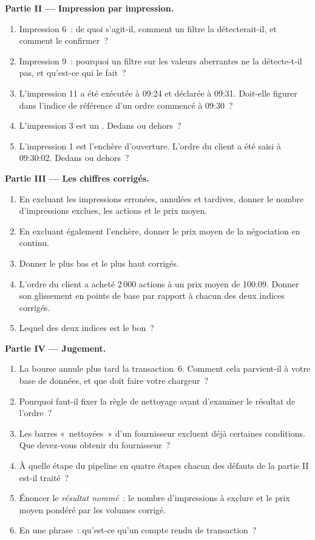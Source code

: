 \begin{problem}
\medskip\noindent\textbf{Partie II --- Impression par impression.}
\begin{enumerate}[resume]
\item Impression 6~: de quoi s'agit-il, comment un filtre la détecterait-il, et comment
le confirmer~?
\item Impression 9~: pourquoi un filtre sur les valeurs aberrantes ne la détecte-t-il pas, et qu'est-ce qui le fait~?
\item L'impression 11 a été exécutée à 09:24 et déclarée à 09:31. Doit-elle figurer dans
l'indice de référence d'un ordre commencé à 09:30~?
\item L'impression 3 est un . Dedans ou dehors~?
\item L'impression 1 est l'enchère d'ouverture. L'ordre du client a été saisi à
09:30:02. Dedans ou dehors~?
\end{enumerate}

\medskip\noindent\textbf{Partie III --- Les chiffres corrigés.}
\begin{enumerate}[resume]
\item En excluant les impressions erronées, annulées et tardives, donner le nombre
d'impressions exclues, les actions et le prix moyen.
\item En excluant également l'enchère, donner le prix moyen de la
négociation en continu.
\item Donner le plus bas et le plus haut corrigés.
\item L'ordre du client a acheté 2\,000 actions à un prix moyen de 100.09. Donner son
glissement en points de base par rapport à chacun des deux indices corrigés.
\item Lequel des deux indices est le bon~?
\end{enumerate}

\medskip\noindent\textbf{Partie IV --- Jugement.}
\begin{enumerate}[resume]
\item La bourse annule plus tard la transaction~6. Comment cela parvient-il à votre base de
données, et que doit faire votre chargeur~?
\item Pourquoi faut-il fixer la règle de nettoyage avant d'examiner
le résultat de l'ordre~?
\item Les barres «~nettoyées~» d'un fournisseur excluent déjà certaines conditions. Que
devez-vous obtenir du fournisseur~?
\item À quelle étape du pipeline en quatre étapes chacun des défauts de la partie II est-il
traité~?
\item Énoncer le \emph{résultat nommé}~: le nombre d'impressions à exclure et le prix moyen
pondéré par les volumes corrigé.
\item En une phrase~: qu'est-ce qu'un compte rendu de transaction~?
\end{enumerate}
\end{problem}

